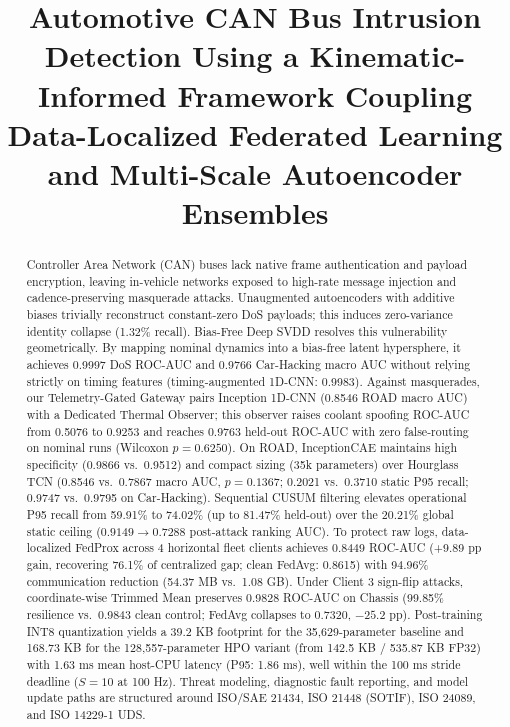 \documentclass[conference]{IEEEtran}
\begin{document}
\title{Automotive CAN Bus Intrusion Detection Using a Kinematic-Informed Framework Coupling Data-Localized Federated Learning and Multi-Scale Autoencoder Ensembles}

\author{
}

\maketitle

\begin{abstract}
Controller Area Network (CAN) buses lack native frame authentication and payload encryption, leaving in-vehicle networks exposed to high-rate message injection and cadence-preserving masquerade attacks. Unaugmented autoencoders with additive biases trivially reconstruct constant-zero DoS payloads; this induces zero-variance identity collapse (1.32\% recall). Bias-Free Deep SVDD resolves this vulnerability geometrically. By mapping nominal dynamics into a bias-free latent hypersphere, it achieves 0.9997 DoS ROC-AUC and 0.9766 Car-Hacking macro AUC without relying strictly on timing features (timing-augmented 1D-CNN: 0.9983). Against masquerades, our Telemetry-Gated Gateway pairs Inception 1D-CNN (0.8546 ROAD macro AUC) with a Dedicated Thermal Observer; this observer raises coolant spoofing ROC-AUC from 0.5076 to 0.9253 and reaches 0.9763 held-out ROC-AUC with zero false-routing on nominal runs (Wilcoxon $p=0.6250$). On ROAD, InceptionCAE maintains high specificity (0.9866 vs.\ 0.9512) and compact sizing (35k parameters) over Hourglass TCN (0.8546 vs.\ 0.7867 macro AUC, $p=0.1367$; 0.2021 vs.\ 0.3710 static P95 recall; 0.9747 vs.\ 0.9795 on Car-Hacking). Sequential CUSUM filtering elevates operational P95 recall from 59.91\% to 74.02\% (up to 81.47\% held-out) over the 20.21\% global static ceiling ($0.9149 \rightarrow 0.7288$ post-attack ranking AUC). To protect raw logs, data-localized FedProx across 4 horizontal fleet clients achieves 0.8449 ROC-AUC (+9.89 pp gain, recovering 76.1\% of centralized gap; clean FedAvg: 0.8615) with 94.96\% communication reduction (54.37 MB vs.\ 1.08 GB). Under Client 3 sign-flip attacks, coordinate-wise Trimmed Mean preserves 0.9828 ROC-AUC on Chassis (99.85\% resilience vs.\ 0.9843 clean control; FedAvg collapses to 0.7320, $-25.2$ pp). Post-training INT8 quantization yields a 39.2 KB footprint for the 35,629-parameter baseline and 168.73 KB for the 128,557-parameter HPO variant (from 142.5 KB / 535.87 KB FP32) with 1.63 ms mean host-CPU latency (P95: 1.86 ms), well within the 100 ms stride deadline ($S=10$ at 100 Hz). Threat modeling, diagnostic fault reporting, and model update paths are structured around ISO/SAE 21434, ISO 21448 (SOTIF), ISO 24089, and ISO 14229-1 UDS.
\end{abstract}
\end{document}
